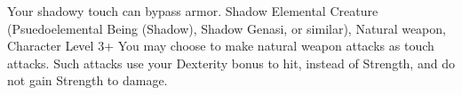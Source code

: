 \shortdescfeat
{Your shadowy touch can bypass armor.}
{Shadow Elemental Creature (Psuedoelemental Being (Shadow), Shadow Genasi, or similar), Natural weapon, Character Level 3+}
{You may choose to make natural weapon attacks as touch attacks.  Such attacks use your Dexterity bonus to hit, instead of Strength, and do not gain Strength to damage.}



